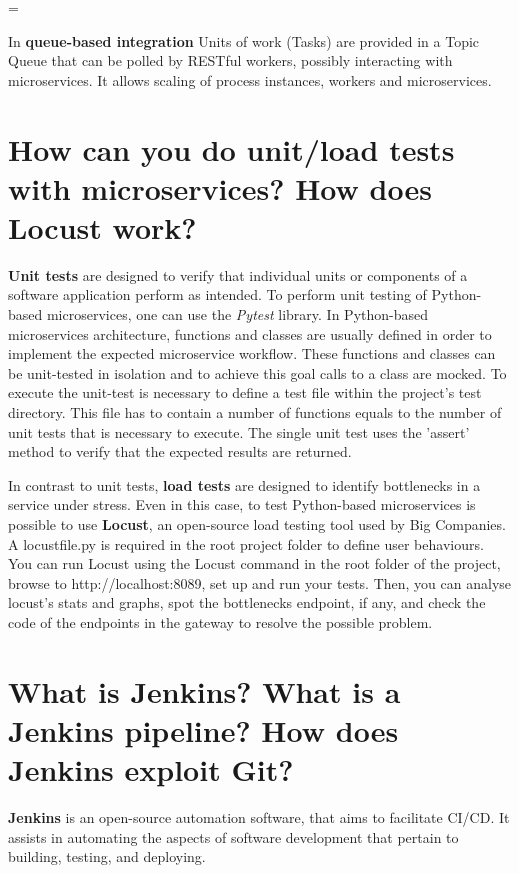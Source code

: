 \parskip = \baselineskip

In \textbf{queue-based integration} Units of work (Tasks) are provided in a Topic Queue that can be polled by RESTful workers, possibly interacting with
microservices. It allows scaling of process instances, workers and microservices.

\section{How can you do unit/load tests with microservices? How does Locust work?}
\textbf{Unit tests} are designed to verify that individual units or components of a software application perform as intended.\nl
To perform unit testing of Python-based microservices, one can use the \textit{Pytest} library.
In Python-based microservices architecture, functions and classes are usually defined in order to implement the expected microservice workflow. These functions and classes can be unit-tested in isolation and to achieve this goal calls to a class are mocked. \nl
To execute the unit-test is necessary to define a test file within the project's test directory. This file has to contain a number of functions equals to the number of unit tests that is necessary to execute. The single unit test uses the 'assert' method to verify that the expected results are returned.\nl

In contrast to unit tests, \textbf{load tests} are designed to identify bottlenecks in a service under stress.
Even in this case, to test Python-based microservices is possible to use \textbf{Locust}, an open-source load testing tool used by Big Companies. A locustfile.py is required in the root project folder to define user behaviours.
You can run Locust using the Locust command in the root folder of the project, browse to http://localhost:8089, set up and run your tests. Then, you can analyse locust’s stats and graphs, spot the bottlenecks endpoint, if any, and check the code of the endpoints in the gateway to resolve the possible problem.

\section{What is Jenkins? What is a Jenkins pipeline? How does Jenkins exploit Git?}
\textbf{Jenkins} is an open-source automation software, that aims to facilitate CI/CD. It assists in automating the aspects of software development that pertain to building, testing, and deploying.

